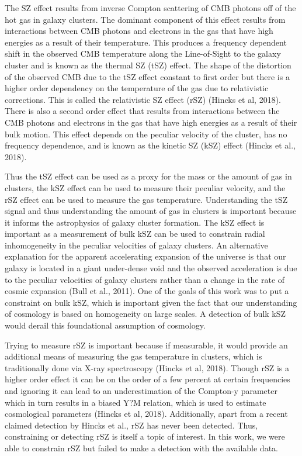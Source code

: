 \documentclass{princeton_astro_thesis}
\begin{document}
\par The SZ effect results from inverse Compton scattering of CMB photons off of the hot gas in galaxy clusters. The dominant component of this effect results from interactions between CMB photons and electrons in the gas that have high energies as a result of their temperature. This produces a frequency dependent shift in the observed CMB temperature along the Line-of-Sight to the galaxy cluster and is known as the thermal SZ (tSZ) effect. The shape of the distortion of the observed CMB due to the tSZ effect constant to first order but there is a higher order dependency on the temperature of the gas due to relativistic corrections. This is called the relativistic SZ effect (rSZ) (Hincks et al, 2018). There is also a second order effect that results from interactions between the CMB photons and electrons in the gas that have high energies as a result of their bulk motion. This effect depends on the peculiar velocity of the cluster, has no frequency dependence, and is known as the kinetic SZ (kSZ) effect (Hincks et al., 2018). 
\par Thus the tSZ effect can be used as a proxy for the mass or the amount of gas in clusters, the kSZ effect can be used to measure their peculiar velocity, and the rSZ effect can be used to measure the gas temperature. Understanding the tSZ signal and thus understanding the amount of gas in clusters is important because it informs the astrophysics of galaxy cluster formation. The kSZ effect is important as a measurement of bulk kSZ can be used to constrain radial inhomogeneity in the peculiar velocities of galaxy clusters. An alternative explanation for the apparent accelerating expansion of the universe is that our galaxy is located in a giant under-dense void and the observed acceleration is due to the peculiar velocities of galaxy clusters rather than a change in the rate of cosmic expansion (Bull et al., 2011). One of the goals of this work was to put a constraint on bulk kSZ, which is important given the fact that our understanding of cosmology is based on homogeneity on large scales. A detection of bulk kSZ would derail this foundational assumption of cosmology.
\par Trying to measure rSZ is important because if measurable, it would provide an additional means of measuring the gas temperature in clusters, which is traditionally done via X-ray spectroscopy (Hincks et al, 2018). Though rSZ is a higher order effect it can be on the order of a few percent at certain frequencies and ignoring it can lead to an underestimation of the Compton-y parameter which in turn results in a biased Y?M relation, which is used to estimate cosmological parameters (Hincks et al, 2018). Additionally, apart from a recent claimed detection by Hincks et al., rSZ has never been detected. Thus, constraining or detecting rSZ is itself a topic of interest. In this work, we were able to constrain rSZ but failed to make a detection with the available data.
\end{document}
